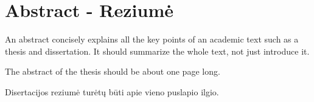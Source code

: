 
\chapter*{Abstract - Reziumė }
\label{cha:abstract}



An abstract concisely explains all the key points of an academic text such as a thesis and dissertation. It should summarize the whole text, not just introduce it.

The abstract of the thesis should be about one page long.

Disertacijos reziumė turėtų būti apie vieno puslapio ilgio.